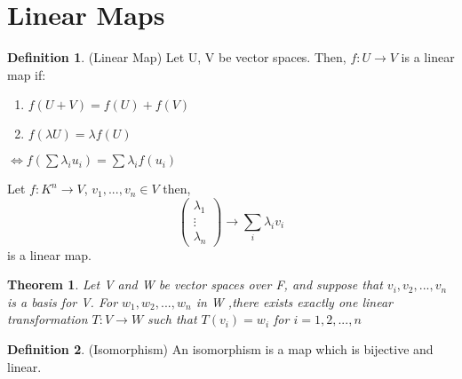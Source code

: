 \documentclass[12pt]{article}
\newtheorem{theorem}{Theorem}[section]
\theoremstyle{definition}
\newtheorem{definition}{Definition}[section]
\theoremstyle{remark}
\begin{document}
\section{Linear Maps}
    \begin{definition}(Linear Map)
        Let U, V be vector spaces. Then, $f: U \rightarrow V$ is a linear map if:
        \begin{enumerate}
            \item $f(U+V)=f(U) + f(V)$
            \item $f(\lambda U)=\lambda f(U)$
        \end{enumerate}
        $\iff f(\sum \lambda_i u_i)=\sum \lambda_i f(u_i)$
    \end{definition}
    \begin{example}
        Let $f:K^n \rightarrow V$, $v_1, ..., v_n \in V$ then, 
        $$\begin{pmatrix}
            \lambda_1\\ \vdots \\ \lambda_n 
        \end{pmatrix} \rightarrow \sum_i \lambda_i v_i$$
        is a linear map.
    \end{example}
    \begin{theorem}
        Let V and W be vector spaces over F, and suppose that ${v_i,v_2,...,v_n}$ is a basis for V.
        For $w_1,w_2,..., w_n$ in W ,there exists exactly one linear transformation $T: V\rightarrow W$ such that $T(v_i) = w_i$ for  $i = 1,2,...,n$ 
    \end{theorem}
    \begin{definition}(Isomorphism)
        An isomorphism is a map which is bijective and linear.
    \end{definition}
\end{document}
